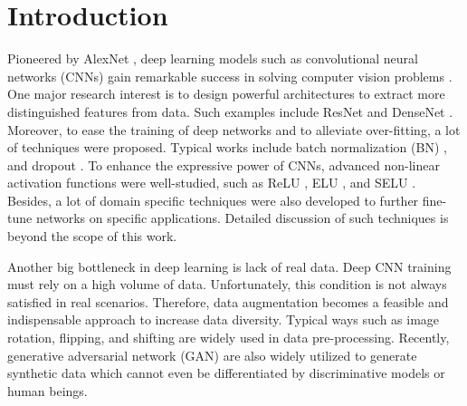 \documentclass[10pt, conference, letterpaper]{IEEEtran}
\begin{document}


\section{Introduction}
\label{introduction}

Pioneered by AlexNet \cite{krizhevsky2012imagenet}, deep learning models such as convolutional neural networks (CNNs) gain remarkable success in solving computer vision problems \cite{simonyan2014very, szegedy2015going, long2015fully, he2016deep, huang2017densely, he2017mask}. One major research interest is to design powerful architectures to extract more distinguished features from data. Such examples include ResNet \cite{he2016deep} and DenseNet \cite{huang2017densely}. Moreover, to ease the training of deep networks and to alleviate over-fitting, a lot of techniques were proposed. Typical works include batch normalization (BN) \cite{ioffe2015batch}, and dropout \cite{krizhevsky2012imagenet}. To enhance the expressive power of CNNs, advanced non-linear activation functions were well-studied, such as ReLU \cite{nair2010rectified}, ELU \cite{clevert2015fast}, and SELU \cite{klambauer2017self}. Besides, a lot of domain specific techniques were also developed to further fine-tune networks on specific applications. Detailed discussion of such techniques is beyond the scope of this work. %

Another big bottleneck in deep learning is lack of real data. Deep CNN training must rely on a high volume of data. Unfortunately, this condition is not always satisfied in real scenarios. Therefore, data augmentation becomes a feasible and indispensable approach to increase data diversity. Typical ways such as image rotation, flipping, and shifting are widely used in data pre-processing. Recently, generative adversarial network (GAN) \cite{goodfellow2014generative} are also widely utilized to generate synthetic data which cannot even be differentiated by discriminative models or human beings.
\end{document}
